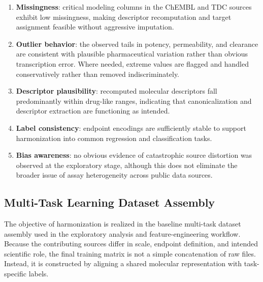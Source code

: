\documentclass[a4paper,11pt,twoside]{report}
\begin{document}
\begin{enumerate}
\item \textbf{Missingness}: critical modeling columns in the ChEMBL and TDC sources exhibit low missingness, making descriptor recomputation and target assignment feasible without aggressive imputation.
\item \textbf{Outlier behavior}: the observed tails in potency, permeability, and clearance are consistent with plausible pharmaceutical variation rather than obvious transcription error. Where needed, extreme values are flagged and handled conservatively rather than removed indiscriminately.
\item \textbf{Descriptor plausibility}: recomputed molecular descriptors fall predominantly within drug-like ranges, indicating that canonicalization and descriptor extraction are functioning as intended.
\item \textbf{Label consistency}: endpoint encodings are sufficiently stable to support harmonization into common regression and classification tasks.
\item \textbf{Bias awareness}: no obvious evidence of catastrophic source distortion was observed at the exploratory stage, although this does not eliminate the broader issue of assay heterogeneity across public data sources.
\end{enumerate}

\subsection{Multi-Task Learning Dataset Assembly}

The objective of harmonization is realized in the baseline multi-task dataset assembly used in the exploratory analysis and feature-engineering workflow. Because the contributing sources differ in scale, endpoint definition, and intended scientific role, the final training matrix is not a simple concatenation of raw files. Instead, it is constructed by aligning a shared molecular representation with task-specific labels.
\end{document}
